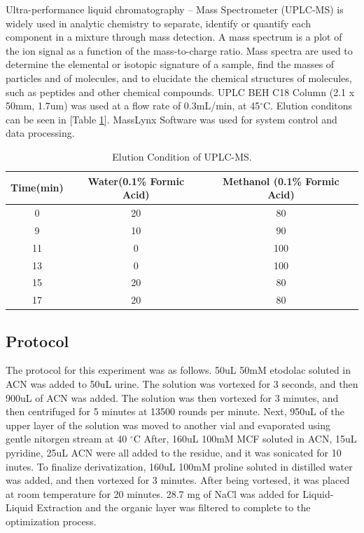 \documentclass[12pt]{article} %
\begin{document}
  Ultra-performance liquid chromatography – Mass Spectrometer (UPLC-MS) is widely used in analytic chemistry to separate, identify or quantify each component in a mixture through mass detection. A mass spectrum is a plot of the ion signal as a function of the mass-to-charge ratio. Mass spectra are used to determine the elemental or isotopic signature of a sample, find the masses of particles and of molecules, and to elucidate the chemical structures of molecules, such as peptides and other chemical compounds. UPLC BEH C18 Column (2.1 x 50mm, 1.7um) was used at a flow rate of 0.3mL/min, at 45$^{\circ}$C. Elution conditons can be seen in [Table \ref{tab:table1}]. MassLynx Software was used for system control and data processing.

\begin{table}[h]
  \begin{center}
    \caption{Elution Condition of UPLC-MS.}
    \label{tab:table1}
    \begin{tabular}{ccc}
      \toprule
      Time(min) & Water(0.1\% Formic Acid) & Methanol (0.1\% Formic Acid) \\
      \midrule
      0 & 20 & 80 \\
      \midrule
      9 & 10 & 90 \\
      \midrule
      11 & 0 & 100 \\
      \midrule
      13 & 0 & 100 \\
      \midrule
      15 & 20 & 80 \\
      \midrule
      17 & 20 & 80 \\
      \bottomrule
    \end{tabular}
  \end{center}
\end{table}

\subsection {Protocol}
 The protocol for this experiment was as follows. 50uL 50mM etodolac soluted in ACN was added to 50uL urine. The solution was vortexed for 3 seconds, and then 900uL of ACN was added. The solution was then vortexed for 3 minutes, and then centrifuged for 5 minutes at 13500 rounds per minute. Next, 950uL of the upper layer of the solution was moved to another vial and evaporated using gentle nitorgen stream at 40 $^{\circ}$C After, 160uL 100mM MCF soluted in ACN, 15uL pyridine, 25uL ACN were all added to the residue, and it was sonicated for 10 inutes. To finalize derivatization, 160uL 100mM proline soluted in distilled water was added, and then vortexed for 3 minutes. After being vortesed, it was placed at room temperature for 20 minutes. 28.7 mg of NaCl was added for Liquid-Liquid Extraction and the organic layer was filtered to complete to the optimization process.
\end{document}
